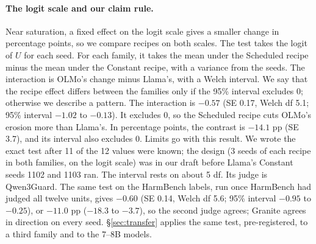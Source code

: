 \documentclass[11pt]{article}
\begin{document}
\paragraph{The logit scale and our claim rule.} Near saturation, a fixed effect on
the logit scale gives a smaller change in percentage points, so we compare
recipes on both scales. The test takes the logit of $U$ for each seed. For each family, it takes the mean under the Scheduled recipe minus the
mean under the Constant recipe, with a variance from the seeds. The interaction
is OLMo's change minus Llama's, with a Welch interval. We say that the recipe
effect differs between the families only if the 95\% interval excludes 0;
otherwise we describe a pattern. The interaction is $-0.57$ (SE 0.17, Welch df
5.1; 95\% interval $-1.02$ to $-0.13$). It excludes 0, so the Scheduled recipe
cuts OLMo's erosion more than Llama's. In percentage points, the contrast is
$-14.1$ pp (SE 3.7), and its interval also excludes 0. Limits go with this
result. We wrote the exact test after 11 of the 12 values were known; the design
(3 seeds of each recipe in both families, on the logit scale) was in our draft
before Llama's Constant seeds 1102 and 1103 ran. The interval rests on about 5
df. Its judge is Qwen3Guard. The same test on the HarmBench labels, run once
HarmBench had judged all twelve units, gives $-0.60$ (SE 0.14, Welch df 5.6;
95\% interval $-0.95$ to $-0.25$), or $-11.0$ pp ($-18.3$ to $-3.7$), so the
second judge agrees; Granite agrees in direction on every seed.
\S\ref{sec:transfer} applies the same test, pre-registered, to a third family
and to the 7--8B models.

\end{document}
